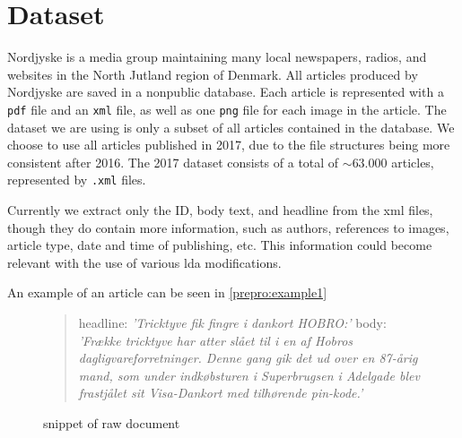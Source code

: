 \section{Dataset}\label{sec:dataset}
Nordjyske is a media group maintaining many local newspapers, radios, and websites in the North Jutland region of Denmark.
All articles produced by Nordjyske are saved in a nonpublic database.
Each article is represented with a \texttt{pdf} file and an \texttt{xml} file, as well as one \texttt{png} file for each image in the article.
The dataset we are using is only a subset of all articles contained in the database.
We choose to use all articles published in 2017, due to the file structures being more consistent after 2016.
The 2017 dataset consists of a total of $\sim 63.000$ articles, represented by \texttt{.xml} files.

Currently we extract only the ID, body text, and headline from the xml files, though they do contain more information, such as authors, references to images, article type, date and time of publishing, etc.
This information could become relevant with the use of various \gls{lda} modifications.

An example of an article can be seen in \autoref{prepro:example1}

\begin{figure}[h]
	\begin{framed}
		\begin{quote}
			headline: \textit{'Tricktyve fik fingre i dankort HOBRO:'}
			body: \textit{'Frække tricktyve har atter slået til i en af Hobros dagligvareforretninger. Denne gang gik det ud over en 87-årig mand, som under indkøbsturen i Superbrugsen i Adelgade blev frastjålet sit Visa-Dankort med tilhørende pin-kode.'}
		\end{quote}
	\end{framed}
		\caption{snippet of raw document}
		\label{prepro:example1}
\end{figure}
